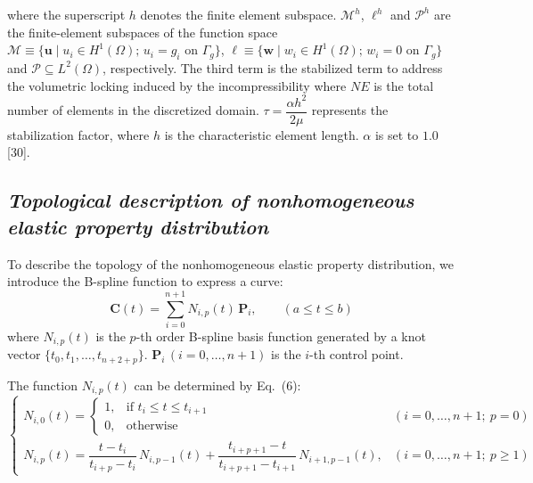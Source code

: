 \documentclass[11pt]{article}
\begin{document}
\newpage

\setcounter{equation}{4}

\noindent
where the superscript $h$ denotes the finite element subspace.
$\mathscr{M}^h$, $\ell^h$ and $\mathscr{P}^h$ are the finite-element
subspaces of the function space
$\mathscr{M} \equiv \{\mathbf{u} \mid u_i \in H^1(\Omega);\,
u_i = g_i \text{ on } \Gamma_g\}$,
$\ell \equiv \{\mathbf{w} \mid w_i \in H^1(\Omega);\,
w_i = 0 \text{ on } \Gamma_g\}$ and
$\mathscr{P} \subseteq L^2(\Omega)$, respectively. The third term is
the stabilized term to address the volumetric locking induced by the
incompressibility where $NE$ is the total number of elements in the
discretized domain. $\tau = \dfrac{\alpha h^{2}}{2\mu}$ represents the
stabilization factor, where $h$ is the characteristic element length.
$\alpha$ is set to $1.0$ [30].

\subsection*{\textit{Topological description of nonhomogeneous elastic property distribution}}

\noindent
To describe the topology of the nonhomogeneous elastic property
distribution, we introduce the B-spline function to express a curve:
\begin{equation}
\mathbf{C}(t) = \sum_{i=0}^{n+1} N_{i,p}(t)\,\mathbf{P}_i,
\qquad (a \leq t \leq b)
\end{equation}
where $N_{i,p}(t)$ is the $p$-th order B-spline basis function
generated by a knot vector $\{t_0, t_1, \ldots, t_{n+2+p}\}$.
$\mathbf{P}_i\,(i = 0, \ldots, n+1)$ is the $i$-th control point.

The function $N_{i,p}(t)$ can be determined by Eq.~(6):
\begin{equation}
\begin{cases}
N_{i,0}(t) =
\begin{cases}
1, & \text{if } t_i \leq t \leq t_{i+1} \\
0, & \text{otherwise}
\end{cases}
& (i = 0, \ldots, n+1;\ p = 0) \\[3.5ex]
N_{i,p}(t) = \dfrac{t - t_i}{t_{i+p} - t_i}\,N_{i,p-1}(t)
+ \dfrac{t_{i+p+1} - t}{t_{i+p+1} - t_{i+1}}\,N_{i+1,p-1}(t),
& (i = 0, \ldots, n+1;\ p \geq 1)
\end{cases}
\end{equation}
\end{document}
